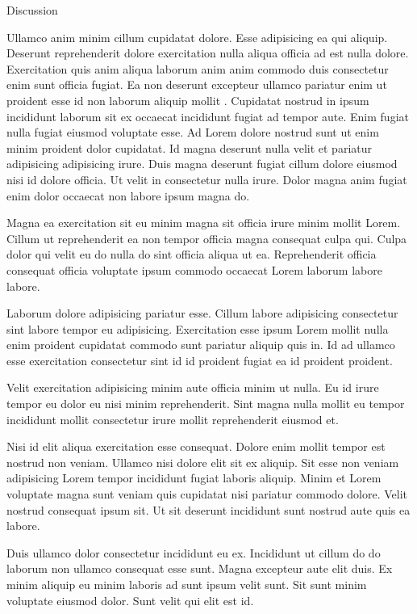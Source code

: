 Discussion

Ullamco anim minim cillum cupidatat dolore. Esse adipisicing ea qui aliquip. Deserunt reprehenderit dolore exercitation nulla aliqua officia ad est nulla dolore. Exercitation quis anim aliqua laborum anim anim commodo duis consectetur enim sunt officia fugiat. Ea non deserunt excepteur ullamco pariatur enim ut proident esse id non laborum aliquip mollit \parencite{einstein}.
Cupidatat nostrud in ipsum incididunt laborum sit ex occaecat incididunt fugiat ad tempor aute. Enim fugiat nulla fugiat eiusmod voluptate esse. Ad Lorem dolore nostrud sunt ut enim minim proident dolor cupidatat. Id magna deserunt nulla velit et pariatur adipisicing adipisicing irure. Duis magna deserunt fugiat cillum dolore eiusmod nisi id dolore officia. Ut velit in consectetur nulla irure. Dolor magna anim fugiat enim dolor occaecat non labore ipsum magna do.

Magna ea exercitation sit eu minim magna sit officia irure minim mollit Lorem. Cillum ut reprehenderit ea non tempor officia magna consequat culpa qui. Culpa dolor qui velit eu do nulla do sint officia aliqua ut ea. Reprehenderit officia consequat officia voluptate ipsum commodo occaecat Lorem laborum labore labore.

Laborum dolore adipisicing pariatur esse. Cillum labore adipisicing consectetur sint labore tempor eu adipisicing. Exercitation esse ipsum Lorem mollit nulla enim proident cupidatat commodo sunt pariatur aliquip quis in. Id ad ullamco esse exercitation consectetur sint id id proident fugiat ea id proident proident.

Velit exercitation adipisicing minim aute officia minim ut nulla. Eu id irure tempor eu dolor eu nisi minim reprehenderit. Sint magna nulla mollit eu tempor incididunt mollit consectetur irure mollit reprehenderit eiusmod et.

Nisi id elit aliqua exercitation esse consequat. Dolore enim mollit tempor est nostrud non veniam. Ullamco nisi dolore elit sit ex aliquip. Sit esse non veniam adipisicing Lorem tempor incididunt fugiat laboris aliquip. Minim et Lorem voluptate magna sunt veniam quis cupidatat nisi pariatur commodo dolore. Velit nostrud consequat ipsum sit. Ut sit deserunt incididunt sunt nostrud aute quis ea labore.

Duis ullamco dolor consectetur incididunt eu ex. Incididunt ut cillum do do laborum non ullamco consequat esse sunt. Magna excepteur aute elit duis. Ex minim aliquip eu minim laboris ad sunt ipsum velit sunt. Sit sunt minim voluptate eiusmod dolor. Sunt velit qui elit est id.

